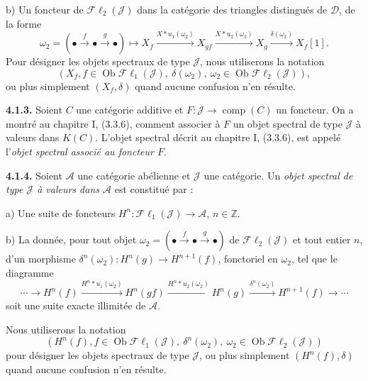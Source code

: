 \clearpage
{}%
\begingroup\small\setlength{\parskip}{0pt}\setlength{\emergencystretch}{1.5em}
b) Un foncteur de $\mathcal{F}\ell_2(\mathcal J)$ dans la catégorie des
triangles distingués de $\mathcal D$, de la forme
\[
\omega_2=(\mathord\bullet\xrightarrow f\mathord\bullet\xrightarrow g\mathord\bullet)
\longmapsto
X_f\xrightarrow{X*u_1(\omega_2)}X_{gf}
\xrightarrow{X*u_2(\omega_2)}X_g
\xrightarrow{\delta(\omega_2)}X_f[1].
\]
Pour désigner les objets spectraux de type $\mathcal J$, nous utiliserons la
notation
\[
(X_f, f\in\operatorname{Ob}\mathcal{F}\ell_1(\mathcal J),\
\delta(\omega_2),
\ \omega_2\in\operatorname{Ob}\mathcal{F}\ell_2(\mathcal J)),
\]
ou plus simplement $(X_f,\delta)$ quand aucune confusion n'en résulte.

\medskip\noindent\textbf{4.1.3.}\quad
Soient $C$ une catégorie additive et
$F\colon\mathcal J\longrightarrow\operatorname{comp}(C)$ un foncteur. On a
montré au chapitre I, (3.3.6), comment associer à $F$ un objet spectral de
type $\mathcal J$ à valeurs dans $K(C)$. L'objet spectral décrit au chapitre
I, (3.3.6), est appelé l'\emph{objet spectral associé au foncteur $F$}.

\medskip\noindent\textbf{4.1.4.}\quad
Soient $\mathcal A$ une catégorie abélienne et $\mathcal J$ une catégorie.
Un \emph{objet spectral de type $\mathcal J$ à valeurs dans $\mathcal A$}
est constitué par :

a) Une suite de foncteurs
$H^n\colon\mathcal{F}\ell_1(\mathcal J)\longrightarrow\mathcal A$,
$n\in\mathbb Z$.

b) La donnée, pour tout objet
$\omega_2=(\mathord\bullet\xrightarrow f\mathord\bullet\xrightarrow g\mathord\bullet)$
de $\mathcal{F}\ell_2(\mathcal J)$ et tout entier $n$, d'un morphisme
$\delta^n(\omega_2)\colon H^n(g)\to H^{n+1}(f)$, fonctoriel en $\omega_2$,
tel que le diagramme
\[
\cdots\longrightarrow H^n(f)
\xrightarrow{H^n*u_1(\omega_2)}H^n(gf)
\xrightarrow{H^n*u_2(\omega_2)}H^n(g)
\xrightarrow{\delta^n(\omega_2)}H^{n+1}(f)
\longrightarrow\cdots
\]
soit une suite exacte illimitée de $\mathcal A$.

Nous utiliserons la notation
\[
(H^n(f), f\in\operatorname{Ob}\mathcal{F}\ell_1(\mathcal J),\
\delta^n(\omega_2),
\ \omega_2\in\operatorname{Ob}\mathcal{F}\ell_2(\mathcal J))
\]
pour désigner les objets spectraux de type $\mathcal J$, ou plus simplement
$(H^n(f),\delta)$ quand aucune confusion n'en résulte.

